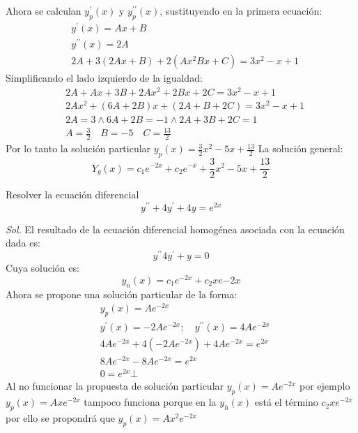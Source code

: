 Ahora se calculan $y^{\prime}_p(x)$ y $y_p^{\prime\prime}(x)$, sustituyendo en la primera ecuación:
\begin{align*}
    &y^{\prime}(x) = Ax + B\\
    &y^{\prime\prime}(x) = 2A\\
    &2A + 3\left(2Ax + B\right) + 2\left(Ax^2 Bx + C\right) = 3x^2 - x + 1
\end{align*}
Simplificando el lado izquierdo de la igualdad:
\begin{align*}
    &2A + Ax + 3B + 2Ax^2 + 2Bx + 2C = 3x^2 - x + 1\\
    &2Ax^2 + \left(6A + 2B\right)x +\left(2A + B + 2C\right) = 3x^2 - x + 1\\
    &2A = 3\land 6A + 2B =- 1\land 2A + 3B + 2C = 1\\
    &A = \frac{3}{2}\quad B =- 5\quad C = \frac{13}{2}
\end{align*}
Por lo tanto la solución particular $y_p(x)= \frac{3}{2}x^2-5x+\frac{13}{2}$
La solución general:
\begin{equation*}
    Y_g(x) =c_1e^{ -2x} +c_2e^{ - x} + \frac{3}{2}x^2 - 5x + \frac{13}{2}
\end{equation*}
\begin{example}
    Resolver la ecuación diferencial 
    \begin{equation*}
        y^{\prime\prime} + 4y^{\prime} + 4y = e^{ 2x}
    \end{equation*}
\end{example}
\textit{ Sol. }
El resultado de la ecuación diferencial homogénea asociada con la ecuación dada es:
\begin{equation*}
    y^{\prime\prime} 4y^{\prime} + y =0
\end{equation*}
Cuya solución es:
\begin{equation*}
    y_n(x) =c_1e^{ -2x} +c_2xe{ - 2x}
\end{equation*}
Ahora se propone una solución particular de la forma:
\begin{align*}
    &y_p(x) = Ae^{ -2x}\\
    &y^{\prime}(x) =- 2Ae^{ - 2x}; \quad y^{\prime\prime}(x) = 4Ae^{ - 2x}\\
    &4Ae^{ -2x} + 4\left( - 2Ae^{ -2x}\right) + 4Ae^{ - 2x} = e^{ 2x}\\
    &8Ae^{ - 2x} - 8Ae^{ - 2x} = e^{ 2x}\\
    &0 = e^{ 2x}\bot
\end{align*}
Al no funcionar la propuesta de solución particular $y_p(x)=Ae^{-2x}$ por ejemplo $y_p(x)=Axe^{-2x}$ tampoco funciona  porque en la $y_h(x)$ está el término $c_2xe^{-2x}$ por ello se propondrá que $y_p(x)=Ax^2e^{-2x}$
